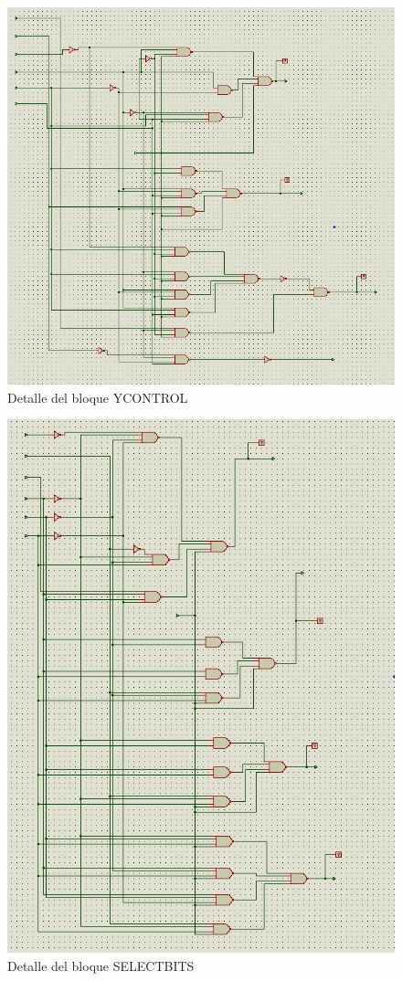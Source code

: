 \documentclass[12pt,a4paper,oneside]{article}
\begin{document}
\begin{figure}[H]
    \includegraphics[width = \textwidth]{proteus-img/ycontrol.PNG}
    \caption{Detalle del bloque YCONTROL}
\end{figure}

\begin{figure}[H]
    \includegraphics[width = \textwidth]{proteus-img/selectbitscontrol.PNG}
    \caption{Detalle del bloque SELECTBITS}
\end{figure}
\end{document}
